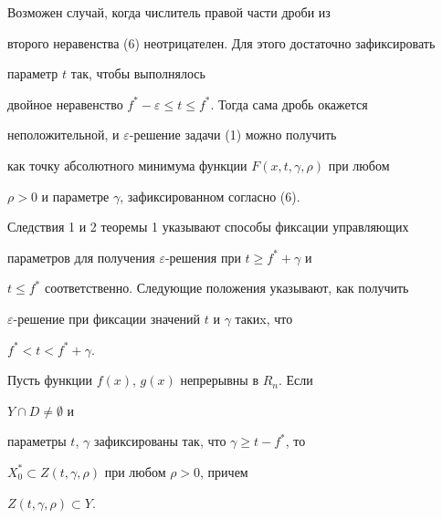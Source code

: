 \begin{notenonum}


Возможен случай, когда числитель правой части дроби из


второго неравенства (6) неотрицателен. Для этого достаточно зафиксировать


параметр $t$ так, чтобы выполнялось 


двойное неравенство $f^*-\varepsilon\le t\le f^*$. Тогда сама дробь окажется


неположительной, и $\varepsilon$-решение задачи (1) можно получить


как точку абсолютного минимума функции $F(x,t,\gamma,\rho)$ при любом


$\rho>0$ и параметре $\gamma$, зафиксированном согласно (6).


\end{notenonum}





Следствия 1 и 2 теоремы 1 указывают способы фиксации управляющих 


параметров для получения $\varepsilon$-решения при $t\ge f^*+\gamma$ и 


$t\le f^*$ соответственно. Следующие положения указывают, как получить 


$\varepsilon$-решение при фиксации значений $t$ и $\gamma$ такиx, что 


$f^*<t<f^*+\gamma$.





\begin{lem}


Пусть функции $f(x)$, $g(x)$ непрерывны в $R_n$. Если


$Y\cap D\ne\emptyset$ и


параметры $t$, $\gamma$ зафиксированы так, что $\gamma\ge t-f^*$, то 


$X_0^*\subset Z(t,\gamma,\rho)$ при любом $\rho>0$, причем


$Z(t,\gamma,\rho)\subset Y$.


\end{lem}





